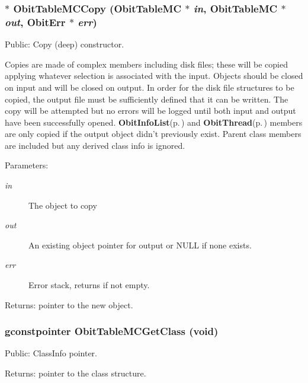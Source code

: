 \subsubsection{$\ast$ Obit\-Table\-MCCopy ({\bf Obit\-Table\-MC} $\ast$ {\em in}, {\bf Obit\-Table\-MC} $\ast$ {\em out}, {\bf Obit\-Err} $\ast$ {\em err})}\label{ObitTableMC_8c_a20}


Public: Copy (deep) constructor. 

Copies are made of complex members including disk files; these will be copied applying whatever selection is associated with the input. Objects should be closed on input and will be closed on output. In order for the disk file structures to be copied, the output file must be sufficiently defined that it can be written. The copy will be attempted but no errors will be logged until both input and output have been successfully opened. {\bf Obit\-Info\-List}{\rm (p.\,\pageref{structObitInfoList})} and {\bf Obit\-Thread}{\rm (p.\,\pageref{structObitThread})} members are only copied if the output object didn't previously exist. Parent class members are included but any derived class info is ignored. \begin{Desc}
\item[Parameters:]
\begin{description}
\item[{\em in}]The object to copy \item[{\em out}]An existing object pointer for output or NULL if none exists. \item[{\em err}]Error stack, returns if not empty. \end{description}
\end{Desc}
\begin{Desc}
\item[Returns:]pointer to the new object. \end{Desc}
\subsubsection{\setlength{\rightskip}{0pt plus 5cm}gconstpointer Obit\-Table\-MCGet\-Class (void)}\label{ObitTableMC_8c_a17}


Public: Class\-Info pointer. 

\begin{Desc}
\item[Returns:]pointer to the class structure. \end{Desc}
